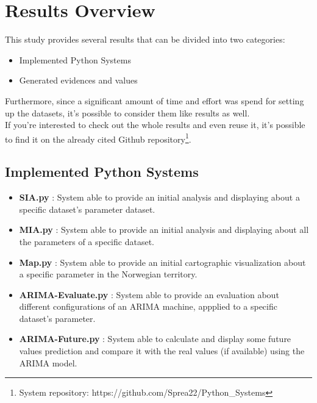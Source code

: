 \chapter{Results Overview}
This study provides several results that can be divided into two categories:
\vspace{-5mm}
\begin{itemize}
 \setlength{\itemsep}{-5pt} 
\item Implemented Python Systems
\item Generated evidences and values
\end{itemize}

Furthermore, since a significant amount of time and effort was spend for setting up the datasets, it's possible to consider them like results as well.\\
If you're interested to check out the whole results and even reuse it, it's possible to find it on the already cited Github repository\footnote{System repository: https://github.com/Sprea22/Python\_Systems}. 

\section{Implemented Python Systems}
\vspace{-5mm}
\begin{itemize}
 \setlength{\itemsep}{-5pt} 
\item \textbf{SIA.py} : System able to provide an initial analysis and displaying about a specific dataset's parameter dataset.
\item \textbf{MIA.py} : System able to provide an initial analysis and displaying about all the parameters of a specific dataset.
\item \textbf{Map.py} : System able to provide an initial cartographic visualization about a specific parameter in the Norwegian territory.
\item \textbf{ARIMA-Evaluate.py} : System able to provide an evaluation about different configurations of an ARIMA machine, appplied to a specific dataset's parameter.
\item \textbf{ARIMA-Future.py} : System able to calculate and display some future values prediction and compare it with the real values (if available) using the ARIMA model.
\end{itemize}

\newpage

